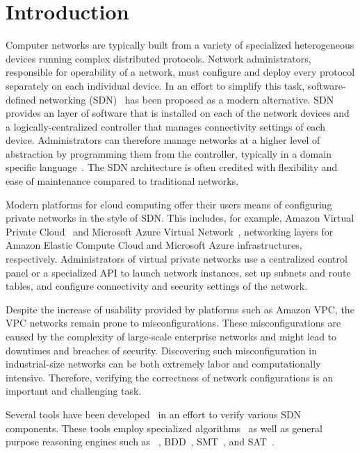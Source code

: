 \section{Introduction}
\label{sect:aws/introduction}
Computer networks are typically built from a variety of specialized heterogeneous devices running complex distributed 
protocols. Network administrators, responsible for operability of a network, must configure and deploy every protocol 
separately on each individual device. In an effort to simplify this task, software-defined networking (SDN)~\cite{SDN} 
has been proposed as a modern alternative. SDN provides an layer of software that is installed on each of the network 
devices and a logically-centralized controller that manages connectivity settings of each device. Administrators can 
therefore manage networks at a higher level of abstraction by programming them from the controller, typically in a domain 
specific language~\cite{DBLP:journals/cm/FosterGRSFKMRRSWH13}. The SDN architecture is often credited with flexibility and ease 
of maintenance compared to traditional networks.

Modern platforms for cloud computing offer their users means of configuring private networks in the style of SDN. This includes, for example, Amazon Virtual Private Cloud~\cite{AmazonVPC} and Microsoft Azure Virtual Network~\cite{AzureVirtualNetwork}, networking layers for Amazon Elastic Compute Cloud and Microsoft Azure infrastructures, respectively. Administrators of virtual private networks use a centralized control panel or a specialized API to launch network instances, set up subnets and route tables, and configure connectivity and security settings of the network.

Despite the increase of usability provided by platforms such as Amazon VPC, the VPC networks remain prone to misconfigurations. These 
misconfigurations are caused by the complexity of large-scale enterprise networks and might lead to downtimes and breaches of 
security. Discovering such misconfiguration in industrial-size networks can be both extremely labor and computationally intensive. Therefore, 
verifying the correctness of network configurations is an important and challenging task.

Several tools have been 
developed~\cite{batfish,jayaraman2014automated,DBLP:conf/icdcit/BjornerJ15,DBLP:conf/pldi/BallBGIKSSV14,Veriflow,ConfigChecker,Anteater,DBLP:conf/cav/El-HassanyTVV17} in an effort to verify various SDN components. These tools employ specialized algorithms~\cite{Veriflow} as well as general purpose 
reasoning engines such as 
\Datalog~\cite{muZ, DBLP:conf/cav/El-HassanyTVV17}, BDD~\cite{ConfigChecker}, SMT~\cite{jayaraman2014automated,DBLP:conf/icdcit/BjornerJ15}, 
and SAT~\cite{Anteater,DBLP:conf/pldi/BallBGIKSSV14}.

